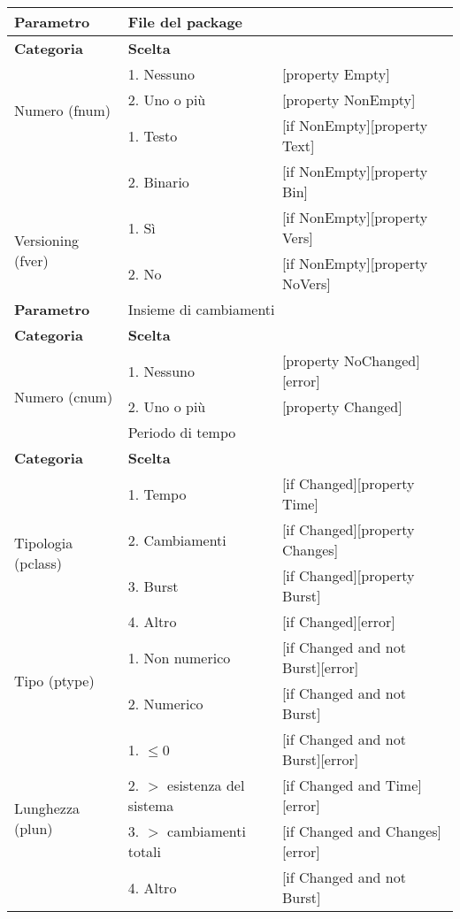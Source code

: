 \begin{tabular}{|p{4cm}|p{4cm}p{5cm}|}
	\hline
	\cellcolor{Gray} \textbf{Parametro}				& \multicolumn{2}{l|}{File del package}							\tabularnewline
	\hline
	\rowcolor{Gray}
	\textbf{Categoria}						& \textbf{Scelta}			&						\tabularnewline
	\hline
	\multirow{3}{*}{Numero (fnum)}					& 1. Nessuno				&	[property Empty] 			\tabularnewline
									\cline{2-3}
									& 2. Uno o più				&	[property NonEmpty]			\tabularnewline
	\hline
	\multirow{2}{*}{Tipo (ftype)}					& 1. Testo				&	[if NonEmpty][property Text] 		\tabularnewline
									\cline{2-3}
									& 2. Binario				&	[if NonEmpty][property Bin]		\tabularnewline
	\hline
	\multirow{2}{*}{Versioning (fver)}				& 1. Sì					&	[if NonEmpty][property Vers] 		\tabularnewline
									\cline{2-3}
									& 2. No					&	[if NonEmpty][property NoVers]		\tabularnewline
	\hline
	
	\cellcolor{Gray} \textbf{Parametro}				& \multicolumn{2}{l|}{Insieme di cambiamenti}						\tabularnewline
	\hline
	\rowcolor{Gray}
	\textbf{Categoria}						& \textbf{Scelta}			&						\tabularnewline
	\hline
	\multirow{3}{*}{Numero (cnum)}					& 1. Nessuno				&	[property NoChanged][error] 			\tabularnewline
									\cline{2-3}
									& 2. Uno o più				&	[property Changed]			\tabularnewline
	\hline
	
	\cellcolor{Gray} \textbf{Parametro}				& \multicolumn{2}{l|}{Periodo di tempo}							\tabularnewline
	\hline
	\rowcolor{Gray}
	\textbf{Categoria}						& \textbf{Scelta}			&						\tabularnewline
	\hline
	\multirow{4}{*}{Tipologia (pclass)}				& 1. Tempo				&	[if Changed][property Time] 		\tabularnewline
									\cline{2-3}
									& 2. Cambiamenti			&	[if Changed][property Changes]		\tabularnewline
									\cline{2-3}
									& 3. Burst				&	[if Changed][property Burst]		\tabularnewline
									\cline{2-3}
									& 4. Altro				&	[if Changed][error]			\tabularnewline
	\hline
	\multirow{2}{*}{Tipo (ptype)}					& 1. Non numerico			&	[if Changed and not Burst][error] 	\tabularnewline
									\cline{2-3}
									& 2. Numerico				&	[if Changed and not Burst]		\tabularnewline
	\hline
	\multirow{4}{*}{Lunghezza (plun)}				& 1. $\leq 0$				&	[if Changed and not Burst][error]	\tabularnewline
									\cline{2-3}
									& 2. $>$ esistenza del sistema		&	[if Changed and Time][error]		\tabularnewline
									\cline{2-3}
									& 3. $>$ cambiamenti totali		&	[if Changed and Changes][error]		\tabularnewline
									\cline{2-3}
									& 4. Altro				&	[if Changed and not Burst]		\tabularnewline
	\hline
\end{tabular}

